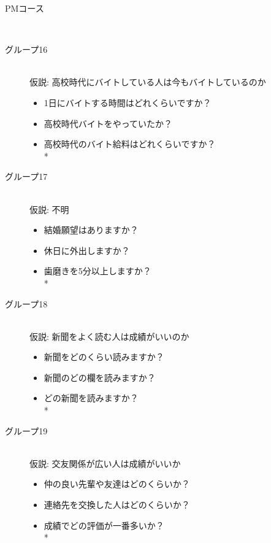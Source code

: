 \begin{description}
 \item[PMコース]\mbox{}\\
\end{description}


\begin{description}

 \item[グループ16]\mbox{}\\ 
 仮説: 高校時代にバイトしている人は今もバイトしているのか
	\begin{itemize}
   	\item 1日にバイトする時間はどれくらいですか？
   	\item 高校時代バイトをやっていたか？
   	\item 高校時代のバイト給料はどれくらいですか？   \vspace{0.1in} \\*
	\end{itemize}
            
 \item[グループ17]\mbox{}\\
 仮説: 不明
	    \begin{itemize}
   	\item 結婚願望はありますか？
   	\item 休日に外出しますか？
   	\item 歯磨きを5分以上しますか？   \vspace{0.1in} \\*
	\end{itemize}

 \item[グループ18]\mbox{}\\
 仮説: 新聞をよく読む人は成績がいいのか
	    \begin{itemize}
   	\item 新聞をどのくらい読みますか？
   	\item 新聞のどの欄を読みますか？
   	\item どの新聞を読みますか？   \vspace{0.1in} \\*
	\end{itemize}

 \item[グループ19]\mbox{}\\
 仮説: 交友関係が広い人は成績がいいか
	    \begin{itemize}
   	\item 仲の良い先輩や友達はどのくらいか？
   	\item 連絡先を交換した人はどのくらいか？
   	\item 成績でどの評価が一番多いか？   \vspace{0.1in} \\*
	\end{itemize}


\end{description}

